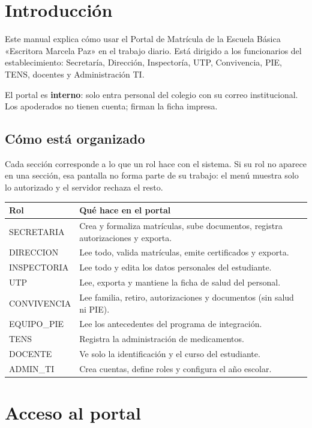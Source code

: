 \section{Introducción}

Este manual explica cómo usar el Portal de Matrícula de la Escuela Básica
«Escritora Marcela Paz» en el trabajo diario. Está dirigido a los funcionarios
del establecimiento: Secretaría, Dirección, Inspectoría, UTP, Convivencia,
PIE, TENS, docentes y Administración TI.

El portal es \textbf{interno}: solo entra personal del colegio con su correo
institucional. Los apoderados no tienen cuenta; firman la ficha impresa.

\subsection{Cómo está organizado}

Cada sección corresponde a lo que un rol hace con el sistema. Si su rol no
aparece en una sección, esa pantalla no forma parte de su trabajo: el menú
muestra solo lo autorizado y el servidor rechaza el resto.

\begin{longtable}{@{}p{}p{}@{}}
\toprule
\textbf{Rol} & \textbf{Qué hace en el portal}\\
\midrule
SECRETARIA & Crea y formaliza matrículas, sube documentos, registra autorizaciones y exporta.\\
DIRECCION & Lee todo, valida matrículas, emite certificados y exporta.\\
INSPECTORIA & Lee todo y edita los datos personales del estudiante.\\
UTP & Lee, exporta y mantiene la ficha de salud del personal.\\
CONVIVENCIA & Lee familia, retiro, autorizaciones y documentos (sin salud ni PIE).\\
EQUIPO\_PIE & Lee los antecedentes del programa de integración.\\
TENS & Registra la administración de medicamentos.\\
DOCENTE & Ve solo la identificación y el curso del estudiante.\\
ADMIN\_TI & Crea cuentas, define roles y configura el año escolar.\\
\bottomrule
\end{longtable}

\section{Acceso al portal}


